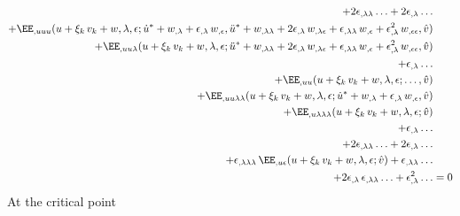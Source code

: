 \begin{equation}
\begin{aligned}[b]
    + 2\epsilon_{,\lambda\lambda} \ldots + 2\epsilon_{,\lambda} \ldots &\\
    + \EE_{,uuu}(u + \xi_k \, v_k + w, \lambda, \epsilon; \dot{u}^\ast + w_{,\lambda} + \epsilon_{,\lambda} \, w_{,\epsilon}, \ddot{u}^\ast + w_{,\lambda\lambda} + 2\epsilon_{,\lambda} \, w_{,\lambda\epsilon} + \epsilon_{,\lambda\lambda} \, w_{,\epsilon} + \epsilon_{,\lambda}^2 \, w_{,\epsilon\epsilon}, \hat{v}) &\\
    + \EE_{,uu\lambda}(u + \xi_k \, v_k + w, \lambda, \epsilon; \ddot{u}^\ast + w_{,\lambda\lambda} + 2\epsilon_{,\lambda} \, w_{,\lambda\epsilon} + \epsilon_{,\lambda\lambda} \, w_{,\epsilon} + \epsilon_{,\lambda}^2 \, w_{,\epsilon\epsilon}, \hat{v}) &\\
    + \epsilon_{,\lambda} \ldots &\\
     + \EE_{,uu}(u + \xi_k \, v_k + w, \lambda, \epsilon; \ldots, \hat{v}) &\\
    + \EE_{,uu\lambda\lambda}(u + \xi_k \, v_k + w, \lambda, \epsilon; \dot{u}^\ast + w_{,\lambda} + \epsilon_{,\lambda} \, w_{,\epsilon}, \hat{v}) &\\
    + \EE_{,u\lambda\lambda\lambda}(u + \xi_k \, v_k + w, \lambda, \epsilon; \hat{v}) &\\
    + \epsilon_{,\lambda} \ldots &\\
    +2\epsilon_{,\lambda\lambda} \ldots + 2\epsilon_{,\lambda} \ldots &\\
    + \epsilon_{,\lambda\lambda\lambda} \, \EE_{,u\epsilon}(u + \xi_k \, v_k + w, \lambda, \epsilon; \hat{v})
    + \epsilon_{,\lambda\lambda} \ldots &\\
    + 2 \epsilon_{,\lambda} \, \epsilon_{,\lambda\lambda} \ldots
    + \epsilon_{,\lambda}^2 \ldots &= 0
  \end{aligned}
\end{equation}
At the critical point
